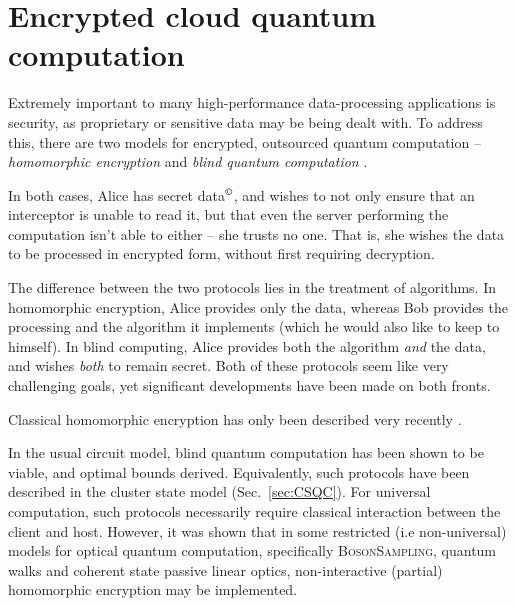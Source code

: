%
%

\section{Encrypted cloud quantum computation} \label{sec:homo_blind} 


Extremely important to many high-performance data-processing applications is security, as proprietary or sensitive data may be being dealt with. To address this, there are two models for encrypted, outsourced quantum computation -- \textit{homomorphic encryption} \cite{???, gentry2009fully, van2010fully} and \textit{blind quantum computation} \cite{???, bib:blind2, bib:blind3, bib:blind1, PhysRevLett.108.200502, bib:Morimae3486, bib:Morimae5460, bib:Morimae3966}.

In both cases, Alice has secret data$^\copyright$, and wishes to not only ensure that an interceptor is unable to read it, but that even the server performing the computation isn't able to either -- she trusts no one. That is, she wishes the data to be processed in encrypted form, without first requiring decryption.

The difference between the two protocols lies in the treatment of algorithms. In homomorphic encryption, Alice provides only the data, whereas Bob provides the processing and the algorithm it implements (which he would also like to keep to himself). In blind computing, Alice provides both the algorithm \textit{and} the data, and wishes \textit{both} to remain secret. Both of these protocols seem like very challenging goals, yet significant developments have been made on both fronts.

Classical homomorphic encryption has only been described very recently \cite{bib:gentry2009fully, bib:van2010fully}. 

In the usual circuit model, blind quantum computation has been shown to be viable, and optimal bounds derived. Equivalently, such protocols have been described in the cluster state model (Sec.~\ref{sec:CSQC}). For universal computation, such protocols necessarily require classical interaction between the client and host. However, it was shown that in some restricted (i.e non-universal) models for optical quantum computation, specifically \textsc{BosonSampling}, quantum walks and coherent state passive linear optics, non-interactive (partial) homomorphic encryption may be implemented.

